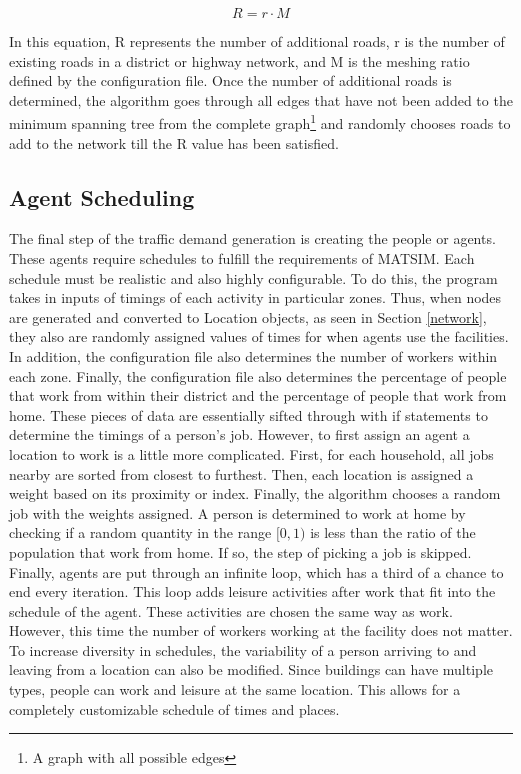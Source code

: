 \documentclass[11pt]{article}
\begin{document}
\begin{multicols}{2}
    \[R = r \cdot M\]

    In this equation, R represents the number of additional roads, r is the number of existing roads in a district or highway network, and M is the meshing ratio defined by the configuration file. Once the number of additional roads is determined, the algorithm goes through all edges that have not been added to the minimum spanning tree from the complete graph\footnote{A graph with all possible edges} and randomly chooses roads to add to the network till the R value has been satisfied. 

    \subsection{Agent Scheduling}

    \quad The final step of the traffic demand generation is creating the people or agents. These agents require schedules to fulfill the requirements of MATSIM\cite{matsim}. Each schedule must be realistic and also highly configurable. To do this, the program takes in inputs of timings of each activity in particular zones. Thus, when nodes are generated and converted to Location objects, as seen in Section \ref{network}, they also are randomly assigned values of times for when agents use the facilities. In addition, the configuration file also determines the number of workers within each zone. Finally, the configuration file also determines the percentage of people that work from within their district and the percentage of people that work from home. These pieces of data are essentially sifted through with if statements to determine the timings of a person's job. However, to first assign an agent a location to work is a little more complicated. First, for each household, all jobs nearby are sorted from closest to furthest. Then, each location is assigned a weight based on its proximity or index. Finally, the algorithm chooses a random job with the weights assigned. A person is determined to work at home by checking if a random quantity in the range \([0, 1)\) is less than the ratio of the population that work from home. If so, the step of picking a job is skipped. Finally, agents are put through an infinite loop, which has a third of a chance to end every iteration. This loop adds leisure activities after work that fit into the schedule of the agent. These activities are chosen the same way as work. However, this time the number of workers working at the facility does not matter. To increase diversity in schedules, the variability of a person arriving to and leaving from a location can also be modified. Since buildings can have multiple types, people can work and leisure at the same location. This allows for a completely customizable schedule of times and places.


\end{multicols}
\end{document}

